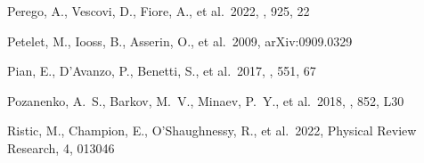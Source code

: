 \documentclass[twocolumn,twocolappendix]{aastex63}
\begin{document}
{\begin{thebibliography}{}


 Perego, A., Vescovi, D., Fiore, A., et al.\ 2022, \apj, 925, 22


 Petelet, M., Iooss, B., Asserin, O., et al.\ 2009, arXiv:0909.0329


 Pian, E., D'Avanzo, P., Benetti, S., et al.\ 2017, \nat, 551, 67









 Pozanenko, A.~S., Barkov, M.~V., Minaev, P.~Y., et al.\ 2018, \apjl, 852, L30






 Ristic, M., Champion, E., O'Shaughnessy, R., et al.\ 2022, Physical Review Research, 4, 013046











\end{thebibliography}}
\end{document}
